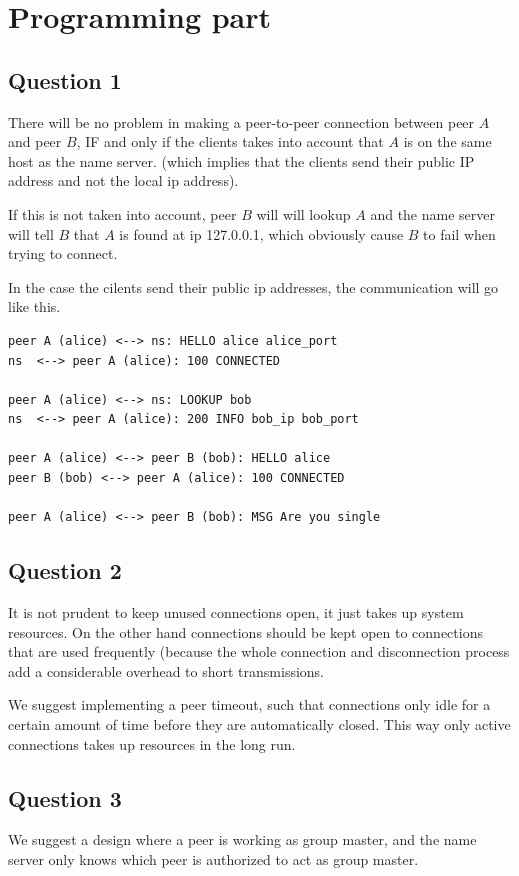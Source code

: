 \section{Programming part}
\subsection{Question 1}
There will be no problem in making a peer-to-peer connection between peer $A$
and peer $B$, IF and only if the clients takes into account that $A$ is on the
same host as the name server. (which implies that the clients send their public IP
address and not the local ip address).

If this is not taken into account, peer $B$ will will lookup $A$ and the name
server will tell $B$ that $A$ is found at ip 127.0.0.1, which obviously cause
$B$ to fail when trying to connect.

In the case the cilents send their public ip addresses, the communication will
go like this.

\begin{lstlisting}
peer A (alice) <--> ns: HELLO alice alice_port
ns  <--> peer A (alice): 100 CONNECTED

peer A (alice) <--> ns: LOOKUP bob
ns  <--> peer A (alice): 200 INFO bob_ip bob_port

peer A (alice) <--> peer B (bob): HELLO alice
peer B (bob) <--> peer A (alice): 100 CONNECTED

peer A (alice) <--> peer B (bob): MSG Are you single
\end{lstlisting}

\subsection{Question 2}
It is not prudent to keep unused connections open, it just takes up system
resources. On the other hand connections should be kept open to connections
that are used frequently (because the whole connection and disconnection
process add a considerable overhead to short transmissions.

We suggest implementing a peer timeout, such that connections only idle for a
certain amount of time before they are automatically closed. This way only
active connections takes up resources in the long run.

\subsection{Question 3}
We suggest a design where a peer is working as group master, and the name
server only knows which peer is authorized to act as group master.

